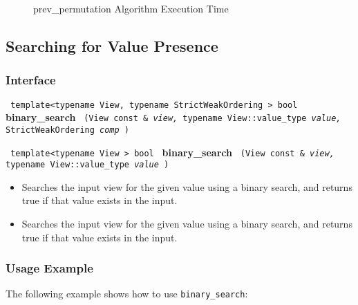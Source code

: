 \begin{figure}[p]
\caption{prev\_permutation Algorithm Execution Time}
\label{fig:prev-perm-alg-exec-exper}
\end{figure}



\subsection{Searching for Value Presence} \label{sec-sort-bin_srch}

\subsubsection{Interface} %

\noindent
\texttt{%
template<typename View, typename StrictWeakOrdering >
\newline
bool 
}
\newline
\textbf{binary\_search}%
\texttt{%
(View const \&
\textit{view,}%
typename View::value\_type 
\textit{value,}%
StrictWeakOrdering 
\textit{comp}%
)
}
\vspace{0.4cm}

\noindent
\texttt{%
template<typename View >
\newline
bool 
}
\newline
\textbf{binary\_search}%
\texttt{%
(View const \&
\textit{view,}%
typename View::value\_type 
\textit{value}%
)
}

\begin{itemize}
\item
Searches the input view for the given value using a binary search, and returns true if that value exists in the input. 
\item
Searches the input view for the given value using a binary search, and returns true if that value exists in the input. 
\end{itemize}

\subsubsection{Usage Example} %

The following example shows how to use \texttt{binary\_search}:

 
